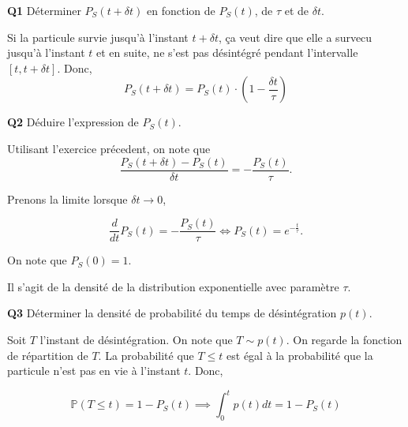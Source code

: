 \documentclass[french]{article}
\begin{document}
	{%
		\begin{tcolorbox}[colback=gray!5!white,colframe=gray!75!black]
			\textbf{\large{Q1}} Déterminer $P_S(t + \delta t)$ en fonction de $P_S(t)$, de $\tau$ et de $\delta t$. 
		\end{tcolorbox}
	
		Si la particule survie jusqu'à l'instant $t + \delta t$, ça veut dire que elle a survecu jusqu'à l'instant $t$ et en suite, ne s'est pas désintégré pendant l'intervalle $[t, t + \delta t]$. Donc,
		\begin{equation}
			P_S(t + \delta t) = P_S(t) \cdot \left(1 - \frac{\delta t}{\tau}\right)
		\end{equation}
	
	
		\begin{tcolorbox}[colback=gray!5!white,colframe=gray!75!black]
			\textbf{\large{Q2}} Déduire l'expression de $P_S(t)$.
		\end{tcolorbox}
	
		Utilisant l'exercice précedent, on note que
		\begin{equation}
			\frac{P_S(t + \delta t) - P_S(t)}{\delta t} = -\frac{P_S(t)}{\tau}.
		\end{equation}
		
		Prenons la limite lorsque $\delta t \to 0$,
		
		\begin{equation}
			\frac{d}{dt}P_S(t) = -\frac{P_S(t)}{\tau} \iff P_S(t) = e^{-\frac{t}{\tau}}.
		\end{equation}
		
		On note que $P_S(0) = 1$.
		
		Il s'agit de la densité de la distribution exponentielle avec paramètre $\tau$.
	
		\begin{tcolorbox}[colback=gray!5!white,colframe=gray!75!black]
			\textbf{\large{Q3}} Déterminer la densité de probabilité du temps de désintégration $p(t)$.
		\end{tcolorbox}
	
		Soit $T$ l'instant de désintégration. On note que $T \sim p(t)$. On regarde la fonction de répartition de $T$. La probabilité que $T \leq t$ est égal à la probabilité que la particule n'est pas en vie à l'instant $t$. Donc, 
		
		\begin{equation}
			\mathbb{P}(T \leq t) = 1 - P_S(t) \implies \int_{0}^{t} p(t) dt = 1 - P_S(t)
		\end{equation}
		
}
\end{document}
